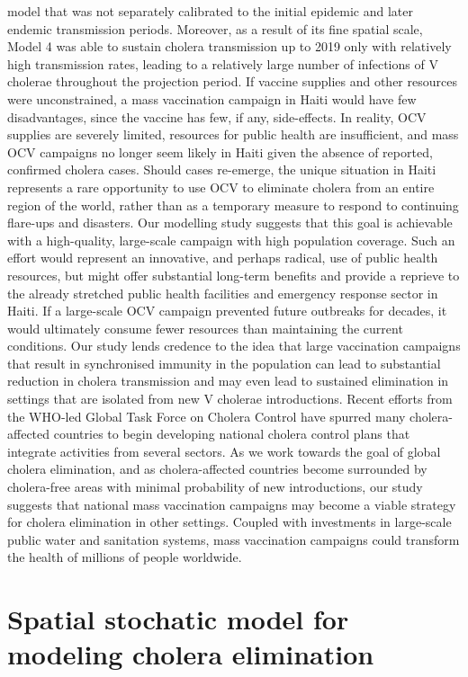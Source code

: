 model that was not separately calibrated to the initial epidemic and later endemic transmission periods. Moreover, as a result of its fine spatial scale, Model 4 was able to sustain cholera transmission up to 2019 only with relatively high transmission rates, leading to a relatively large number of infections of V cholerae throughout the projection period. If vaccine supplies and other resources were unconstrained, a mass vaccination campaign in Haiti would have few disadvantages, since the vaccine has few, if any, side-effects. In reality, OCV supplies are severely limited, resources for public health are insufficient, and mass OCV campaigns no longer seem likely in Haiti given the absence of reported, confirmed cholera cases. Should cases re-emerge, the unique situation in Haiti represents a rare opportunity to use OCV to eliminate cholera from an entire region of the world, rather than as a temporary measure to respond to continuing flare-ups and disasters. Our modelling study suggests that this goal is achievable with a high-quality, large-scale campaign with high population coverage. Such an effort would represent an innovative, and perhaps radical, use of public health resources, but might offer substantial long-term benefits and provide a reprieve to the already stretched public health facilities and emergency response sector in Haiti. If a large-scale OCV campaign prevented future outbreaks for decades, it would ultimately consume fewer resources than maintaining the current conditions. Our study lends credence to the idea that large vaccination campaigns that result in synchronised immunity in the population can lead to substantial reduction in cholera transmission and may even lead to sustained elimination in settings that are isolated from new V cholerae introductions. Recent efforts from the WHO-led Global Task Force on Cholera Control have spurred many cholera-affected countries to begin developing national cholera control plans that integrate activities from several sectors. As we work towards the goal of global cholera elimination, and as cholera-affected countries become surrounded by cholera-free areas with minimal probability of new introductions, our study suggests that national mass vaccination campaigns may become a viable strategy for cholera elimination in other settings. Coupled with investments in large-scale public water and sanitation systems, mass vaccination campaigns could transform the health of millions of people worldwide.

\section{Spatial stochatic model for modeling cholera elimination}
